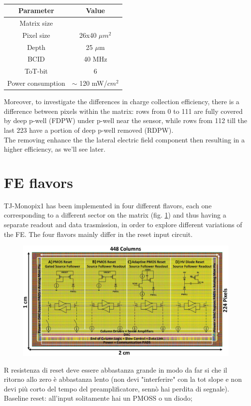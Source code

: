     \begin{table}
        \begin{center}
        \begin{tabular}{| c |c |}
        \hline
        Parameter & Value\\
        \hline
        \hline
        Matrix size & \\
        Pixel size & 26x40 $\mu m^2$\\
        Depth & 25 $\mu$m \\
        BCID & 40 MHz \\
        ToT-bit & 6 \\
        Power consumption & $\sim$ 120 mW/$cm^2$\\
        \hline
        \end{tabular}
        \caption{}
        \label{tab:LF-TJ-Monopix}
        \end{center}
    \end{table}
    Moreover, to investigate the differences in charge collection efficiency, there is a difference between pixels within the matrix: rows from 0 to 111 are fully covered by deep p-well (FDPW) under p-well near the sensor, while rows from 112 till the last 223 have a portion of deep p-well removed (RDPW). \\
    The removing enhance the the lateral electric field component then resulting in a higher efficiency, as we'll see later.\\

\section{FE flavors}
    TJ-Monopix1 has been implemented in four different flavors, each one corresponding to a different sector on the matrix (fig. \ref{fig:Monopix1_flavors}) and thus having a separate readout and data trasmission, in order to explore different variations of the FE. The four flavors mainly differ in the reset input circuit.
    \begin{figure}[h!]
        \centering
        \includegraphics[width=.5\linewidth]{figures/Monopix1/Monopix1_flavors.png}
        \caption{}
        \label{fig:Monopix1_flavors}
    \end{figure}
    R resistenza di reset deve essere abbastanza grande in modo da far si che il ritorno allo zero è abbastanza lento (non devi "interferire" con la tot slope e non devi più corto del tempo del preamplificatore, sennò hai perdita di segnale).\\
    Baseline reset: all'input solitamente hai un PMOSS o un diodo;  

